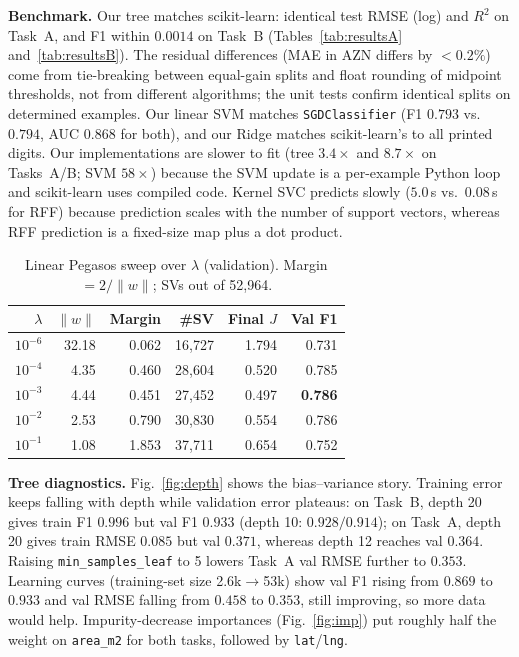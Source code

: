 \documentclass[10pt,twocolumn,a4paper]{article}
\begin{document}
\textbf{Benchmark.} Our tree matches scikit-learn: identical test RMSE (log) and
$R^2$ on Task~A, and F1 within $0.0014$ on Task~B (Tables~\ref{tab:resultsA}
and~\ref{tab:resultsB}). The residual differences (MAE in AZN differs by $<0.2\%$)
come from tie-breaking between equal-gain splits and float rounding of midpoint
thresholds, not from different algorithms; the unit tests confirm identical splits
on determined examples. Our linear SVM matches \texttt{SGDClassifier}
(F1 $0.793$ vs.\ $0.794$, AUC $0.868$ for both), and our Ridge matches
scikit-learn's to all printed digits. Our implementations are slower to fit
(tree $3.4\times$ and $8.7\times$ on Tasks~A/B; SVM $58\times$) because the SVM
update is a per-example Python loop and scikit-learn uses compiled code. Kernel
SVC predicts slowly ($5.0$\,s vs.\ $0.08$\,s for RFF) because prediction scales with
the number of support vectors, whereas RFF prediction is a fixed-size map plus a dot product.

\begin{table}[t]
  \centering
  \small
  \caption{Linear Pegasos sweep over $\lambda$ (validation). Margin $=2/\lVert w\rVert$; SVs out of 52{,}964.}
  \label{tab:svm}
  \begin{tabular}{@{}rrrrrr@{}}
    \toprule
    $\lambda$ & $\lVert w\rVert$ & Margin & \#SV & Final $J$ & Val F1 \\
    \midrule
    $10^{-6}$ & 32.18 & 0.062 & 16{,}727 & 1.794 & 0.731 \\
    $10^{-4}$ & 4.35  & 0.460 & 28{,}604 & 0.520 & 0.785 \\
    $10^{-3}$ & 4.44  & 0.451 & 27{,}452 & 0.497 & \textbf{0.786} \\
    $10^{-2}$ & 2.53  & 0.790 & 30{,}830 & 0.554 & 0.786 \\
    $10^{-1}$ & 1.08  & 1.853 & 37{,}711 & 0.654 & 0.752 \\
    \bottomrule
  \end{tabular}
\end{table}

\textbf{Tree diagnostics.} Fig.~\ref{fig:depth} shows the bias--variance story.
Training error keeps falling with depth while validation error plateaus:
on Task~B, depth 20 gives train F1 $0.996$ but val F1 $0.933$ (depth 10:
$0.928/0.914$); on Task~A, depth 20 gives train RMSE $0.085$ but val
$0.371$, whereas depth 12 reaches val $0.364$. Raising \texttt{min\_samples\_leaf}
to 5 lowers Task~A val RMSE further to $0.353$. Learning curves (training-set
size 2.6k$\to$53k) show val F1 rising from $0.869$ to $0.933$ and val RMSE
falling from $0.458$ to $0.353$, still improving, so more data would help.
Impurity-decrease importances (Fig.~\ref{fig:imp}) put roughly half the weight on
\texttt{area\_m2} for both tasks, followed by \texttt{lat}/\texttt{lng}.
\end{document}

